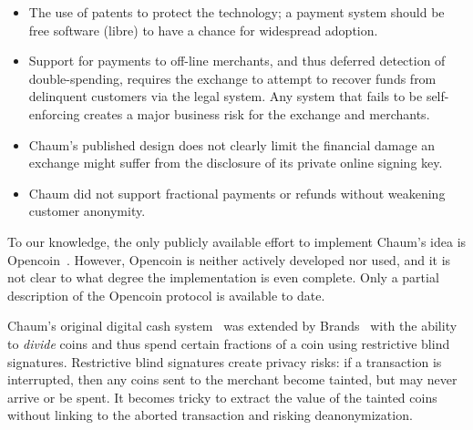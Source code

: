 \documentclass[sigconf, authordraft]{acmart}
\begin{document}
\begin{itemize}
 \item The use of patents to protect the technology; a payment system
   should be free software (libre) to have a chance for widespread adoption.
 \item Support for payments to off-line merchants, and thus deferred
   detection of double-spending, requires the exchange to attempt to
   recover funds from delinquent customers via the legal system.
   Any system that fails to be self-enforcing creates a major
   business risk for the exchange and merchants.
 \item %
   Chaum's published design does not clearly
   limit the financial damage an exchange might suffer from the
   disclosure of its private online signing key.
 \item Chaum did not support fractional payments or refunds without
   weakening customer anonymity.
\end{itemize}

To our knowledge, the only publicly available effort to implement
Chaum's idea is Opencoin~\cite{dent2008extensions}.  However, Opencoin
is neither actively developed nor used, and it is not clear
to what degree the implementation is even complete.  Only a partial
description of the Opencoin protocol is available to date.

Chaum's original digital cash system~\cite{chaum1983blind} was
extended by Brands~\cite{brands1993efficient} with the ability to {\em
  divide} coins and thus spend certain fractions of a coin using
restrictive blind signatures.  Restrictive blind signatures create
privacy risks: if a transaction is interrupted, then any coins sent
to the merchant become tainted, but may never arrive or be spent.
It becomes tricky to extract the value of the tainted coins without
linking to the aborted transaction and risking deanonymization.
\end{document}
